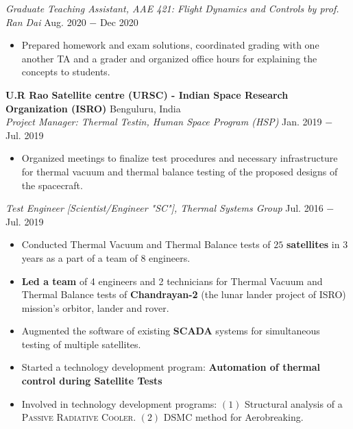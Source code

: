 \documentclass[letterpaper,11pt]{article}
\begin{document}
\vspace{3pt}
\noindent \textit{Graduate Teaching Assistant, AAE 421: Flight Dynamics and Controls by prof. Ran Dai} \hfill Aug. 2020 $-$ Dec 2020
\begin{itemize}[noitemsep,nolistsep,leftmargin=0.25in,label={--}]
    \item Prepared homework and exam solutions, coordinated grading with one another TA and a grader and organized office hours for explaining the concepts to students.
\end{itemize}

\vspace{5pt}
\noindent \textbf{U.R Rao Satellite centre (URSC) - Indian Space Research Organization (ISRO)} \hfill Benguluru, India \\
\textit{Project Manager: Thermal Testin, Human Space Program (HSP)} \hfill Jan. 2019 $-$ Jul. 2019
\begin{itemize}[noitemsep,nolistsep,leftmargin=0.25in,label={--}]
    \item Organized meetings to finalize test procedures and necessary infrastructure for thermal vacuum and thermal balance testing of the proposed designs of the spacecraft.
\end{itemize}

\vspace{3pt}
\textit{Test Engineer [Scientist/Engineer "SC"], Thermal Systems Group} \hfill Jul. 2016 $-$ Jul. 2019
\begin{itemize}[noitemsep,nolistsep,leftmargin=0.25in,label={--}]
    \item Conducted Thermal Vacuum and Thermal Balance tests of $25$ \textbf{satellites} in 3 years as a part of a team of 8 engineers.
	\item \textbf{Led a team} of 4 engineers and 2 technicians for Thermal Vacuum and Thermal Balance tests of \textbf{Chandrayan-2} (the lunar lander project of ISRO) mission's orbitor, lander and rover. 
    \item Augmented the software of existing \textbf{SCADA} systems for simultaneous testing of multiple satellites.  
	\item Started a technology development program: \textbf{Automation of thermal control during Satellite Tests}
	\item Involved in technology development programs: $(1)$ Structural analysis of a \textsc{Passive Radiative Cooler}. $(2)$ DSMC method for Aerobreaking.
\end{itemize}
\end{document}
